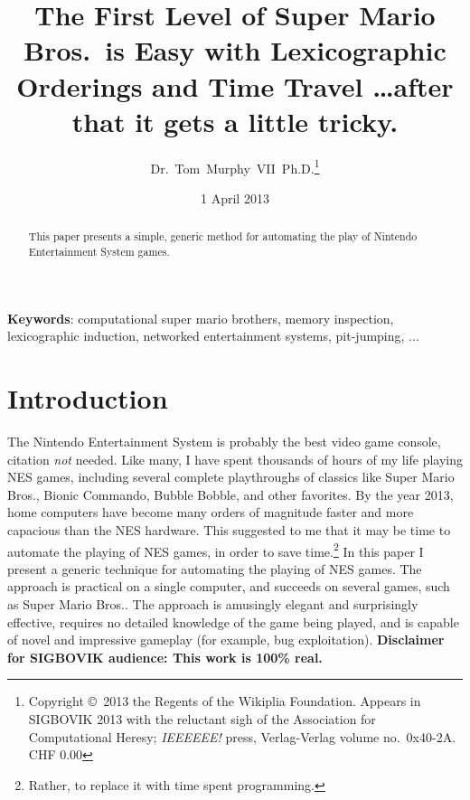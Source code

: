 \documentclass[twocolumn]{article}
\begin{document}
 

\title{The First Level of Super Mario Bros.~is Easy with
       Lexicographic Orderings and Time Travel
       {\normalsize \ldots after that it gets a little tricky.}}
\author{Dr.~Tom~Murphy~VII~Ph.D.\thanks{
Copyright \copyright\ 2013 the Regents of the Wikiplia
Foundation. Appears in SIGBOVIK 2013 with the reluctant sigh of the
Association for Computational Heresy; {\em IEEEEEE!} press,
Verlag-Verlag volume no.~0x40-2A.
CHF 0.00}
}

\renewcommand\>{$>$}
\newcommand\<{$<$}

\date{1 April 2013}

\maketitle

\begin{abstract}
This paper presents a simple, generic method for automating the play
of Nintendo Entertainment System games.
\end{abstract}

\vspace{1em}
{\noindent \small {\bf Keywords}:
  computational super mario brothers, memory inspection, lexicographic induction, networked entertainment systems, pit-jumping, ...

}

\section{Introduction}
The Nintendo Entertainment System is probably the best video game
console, citation {\it not} needed. Like many, I have spent thousands
of hours of my life playing NES games, including several complete
playthroughs of classics like Super Mario Bros., Bionic Commando,
Bubble Bobble, and other favorites. By the year 2013, home computers
have become many orders of magnitude faster and more capacious than
the NES hardware. This suggested to me that it may be time to automate
the playing of NES games, in order to save time.\footnote{Rather, to
  replace it with time spent programming.} In this paper I present a
generic technique for automating the playing of NES games. The
approach is practical on a single computer, and succeeds on several
games, such as Super Mario Bros.. The approach is amusingly elegant
and surprisingly effective, requires no detailed knowledge of the game
being played, and is capable of novel and impressive gameplay (for
example, bug exploitation). {\bf Disclaimer for SIGBOVIK audience:
  This work is 100\% real.}
\end{document}
